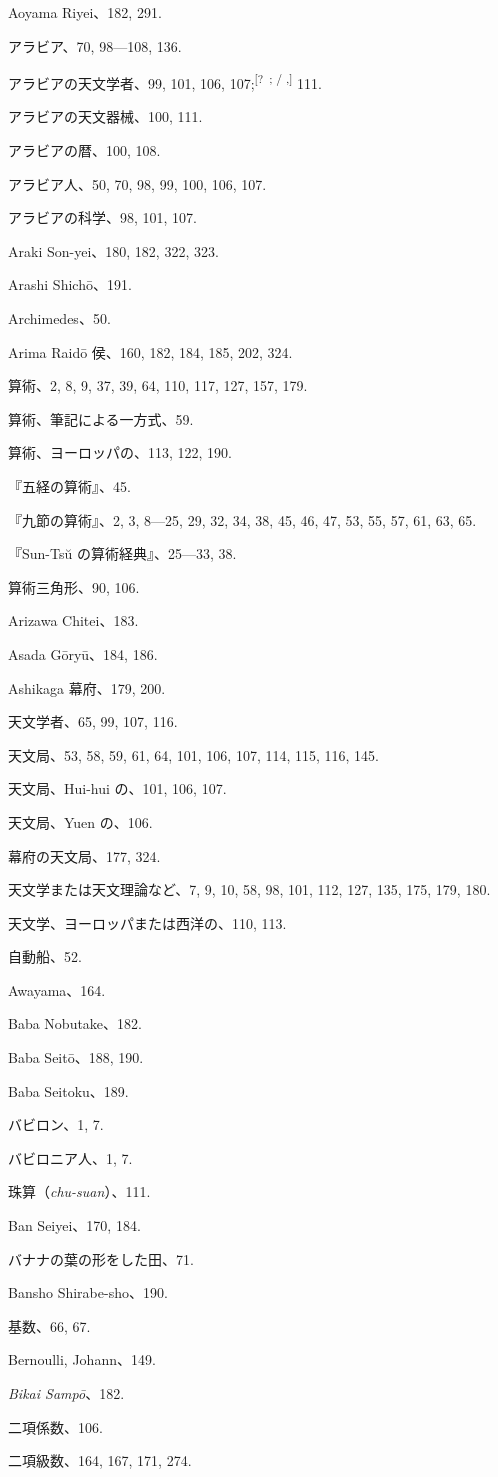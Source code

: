 \documentclass[11pt]{article}
\newcommand{\unclear}[1]{\textsuperscript{[?~#1]}}
\begin{document}
Aoyama Riyei、182, 291.\par
アラビア、70, 98---108, 136.\par
アラビアの天文学者、99, 101, 106, 107;\unclear{; / ,} 111.\par
アラビアの天文器械、100, 111.\par
アラビアの暦、100, 108.\par
アラビア人、50, 70, 98, 99, 100, 106, 107.\par
アラビアの科学、98, 101, 107.\par
Araki Son-yei、180, 182, 322, 323.\par
Arashi Shichō、191.\par
Archimedes、50.\par
Arima Raidō 侯、160, 182, 184, 185, 202, 324.\par
算術、2, 8, 9, 37, 39, 64, 110, 117, 127, 157, 179.\par
算術、筆記による一方式、59.\par
算術、ヨーロッパの、113, 122, 190.\par
『五経の算術』、45.\par
『九節の算術』、2, 3, 8---25, 29, 32, 34, 38, 45, 46, 47, 53, 55, 57, 61, 63, 65.\par
『Sun-Tsŭ の算術経典』、25---33, 38.\par
算術三角形、90, 106.\par
Arizawa Chitei、183.\par
Asada Gōryū、184, 186.\par
Ashikaga 幕府、179, 200.\par
天文学者、65, 99, 107, 116.\par
天文局、53, 58, 59, 61, 64, 101, 106, 107, 114, 115, 116, 145.\par
天文局、Hui-hui の、101, 106, 107.\par
天文局、Yuen の、106.\par
幕府の天文局、177, 324.\par
天文学または天文理論など、7, 9, 10, 58, 98, 101, 112, 127, 135, 175, 179, 180.\par
天文学、ヨーロッパまたは西洋の、110, 113.\par
自動船、52.\par
Awayama、164.\par
\medskip
Baba Nobutake、182.\par
Baba Seitō、188, 190.\par
Baba Seitoku、189.\par
バビロン、1, 7.\par
バビロニア人、1, 7.\par
珠算（\emph{chu-suan}）、111.\par
Ban Seiyei、170, 184.\par
バナナの葉の形をした田、71.\par
Bansho Shirabe-sho、190.\par
基数、66, 67.\par
Bernoulli, Johann、149.\par
\emph{Bikai Sampō}、182.\par
二項係数、106.\par
二項級数、164, 167, 171, 274.\par
\end{document}
